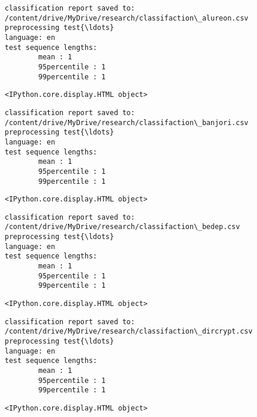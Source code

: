\documentclass[11pt]{article}
\begin{document}
    
    \begin{Verbatim}[commandchars=\\\{\}]
classification report saved to:
/content/drive/MyDrive/research/classifaction\_alureon.csv
preprocessing test{\ldots}
language: en
test sequence lengths:
        mean : 1
        95percentile : 1
        99percentile : 1
    \end{Verbatim}

    
    \begin{Verbatim}[commandchars=\\\{\}]
<IPython.core.display.HTML object>
    \end{Verbatim}

    
    \begin{Verbatim}[commandchars=\\\{\}]
classification report saved to:
/content/drive/MyDrive/research/classifaction\_banjori.csv
preprocessing test{\ldots}
language: en
test sequence lengths:
        mean : 1
        95percentile : 1
        99percentile : 1
    \end{Verbatim}

    
    \begin{Verbatim}[commandchars=\\\{\}]
<IPython.core.display.HTML object>
    \end{Verbatim}

    
    \begin{Verbatim}[commandchars=\\\{\}]
classification report saved to:
/content/drive/MyDrive/research/classifaction\_bedep.csv
preprocessing test{\ldots}
language: en
test sequence lengths:
        mean : 1
        95percentile : 1
        99percentile : 1
    \end{Verbatim}

    
    \begin{Verbatim}[commandchars=\\\{\}]
<IPython.core.display.HTML object>
    \end{Verbatim}

    
    \begin{Verbatim}[commandchars=\\\{\}]
classification report saved to:
/content/drive/MyDrive/research/classifaction\_dircrypt.csv
preprocessing test{\ldots}
language: en
test sequence lengths:
        mean : 1
        95percentile : 1
        99percentile : 1
    \end{Verbatim}

    
    \begin{Verbatim}[commandchars=\\\{\}]
<IPython.core.display.HTML object>
    \end{Verbatim}
\end{document}
